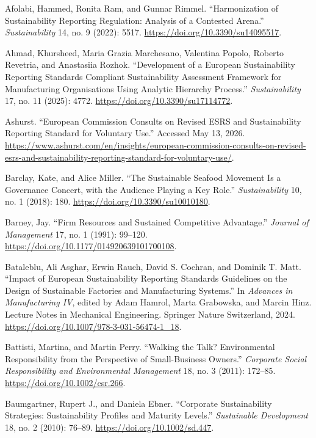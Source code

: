 Afolabi, Hammed, Ronita Ram, and Gunnar Rimmel. ``Harmonization of Sustainability Reporting Regulation: Analysis of a Contested Arena.'' \emph{Sustainability} 14, no. 9 (2022): 5517. \url{https://doi.org/10.3390/su14095517}. %

Ahmad, Khursheed, Maria Grazia Marchesano, Valentina Popolo, Roberto Revetria, and Anastasiia Rozhok. ``Development of a European Sustainability Reporting Standards Compliant Sustainability Assessment Framework for Manufacturing Organisations Using Analytic Hierarchy Process.'' \emph{Sustainability} 17, no. 11 (2025): 4772. \url{https://doi.org/10.3390/su17114772}.

Ashurst. ``European Commission Consults on Revised ESRS and Sustainability Reporting Standard for Voluntary Use.'' Accessed May 13, 2026. \url{https://www.ashurst.com/en/insights/european-commission-consults-on-revised-esrs-and-sustainability-reporting-standard-for-voluntary-use/}.

Barclay, Kate, and Alice Miller. ``The Sustainable Seafood Movement Is a Governance Concert, with the Audience Playing a Key Role.'' \emph{Sustainability} 10, no. 1 (2018): 180. \url{https://doi.org/10.3390/su10010180}.

Barney, Jay. ``Firm Resources and Sustained Competitive Advantage.'' \emph{Journal of Management} 17, no. 1 (1991): 99--120. \url{https://doi.org/10.1177/014920639101700108}. %

Bataleblu, Ali Asghar, Erwin Rauch, David S. Cochran, and Dominik T. Matt. ``Impact of European Sustainability Reporting Standards Guidelines on the Design of Sustainable Factories and Manufacturing Systems.'' In \emph{Advances in Manufacturing IV}, edited by Adam Hamrol, Marta Grabowska, and Marcin Hinz. Lecture Notes in Mechanical Engineering. Springer Nature Switzerland, 2024. \url{https://doi.org/10.1007/978-3-031-56474-1\_18}.

Battisti, Martina, and Martin Perry. ``Walking the Talk? Environmental Responsibility from the Perspective of Small-Business Owners.'' \emph{Corporate Social Responsibility and Environmental Management} 18, no. 3 (2011): 172--85. \url{https://doi.org/10.1002/csr.266}.

Baumgartner, Rupert J., and Daniela Ebner. ``Corporate Sustainability Strategies: Sustainability Profiles and Maturity Levels.'' \emph{Sustainable Development} 18, no. 2 (2010): 76--89. \url{https://doi.org/10.1002/sd.447}.

